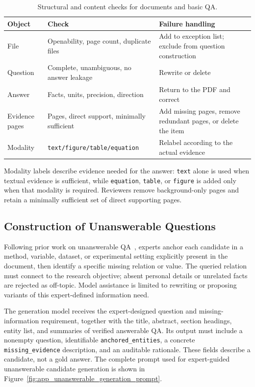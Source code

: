 \documentclass{article} %
\begin{document}
\begin{table}[!htb]
\centering
\caption{Structural and content checks for documents and basic QA.}
\label{tab:app_basic_checks}
\small
\begin{tabularx}{\linewidth}{l X X}
\toprule
\textbf{Object} & \textbf{Check} & \textbf{Failure handling} \\
\midrule
File & Openability, page count, duplicate files & Add to exception list; exclude from question construction \\
Question & Complete, unambiguous, no answer leakage & Rewrite or delete \\
Answer & Facts, units, precision, direction & Return to the PDF and correct \\
Evidence pages & Pages, direct support, minimally sufficient & Add missing pages, remove redundant pages, or delete the item \\
Modality & \texttt{text/figure/table/equation} & Relabel according to the actual evidence \\
\bottomrule
\end{tabularx}
\end{table}

Modality labels describe evidence needed for the answer: \texttt{text} alone is used when textual evidence is sufficient, while \texttt{equation}, \texttt{table}, or \texttt{figure} is added only when that modality is required. Reviewers remove background-only pages and retain a minimally sufficient set of direct supporting pages.

\subsection{Construction of Unanswerable Questions}
\label{app:unanswerable_construction}

Following prior work on unanswerable QA~\cite{rajpurkar2018know}, experts anchor each candidate in a method, variable, dataset, or experimental setting explicitly present in the document, then identify a specific missing relation or value. The queried relation must connect to the research objective; absent personal details or unrelated facts are rejected as off-topic. Model assistance is limited to rewriting or proposing variants of this expert-defined information need.

The generation model receives the expert-designed question and missing-information requirement, together with the title, abstract, section headings, entity list, and summaries of verified answerable QA. Its output must include a nonempty question, identifiable \texttt{anchored\_\allowbreak entities}, a concrete \texttt{missing\_\allowbreak evidence} description, and an auditable rationale. These fields describe a candidate, not a gold answer. The complete prompt used for expert-guided unanswerable candidate generation is shown in Figure~\ref{fig:app_unanswerable_generation_prompt}.
\end{document}
